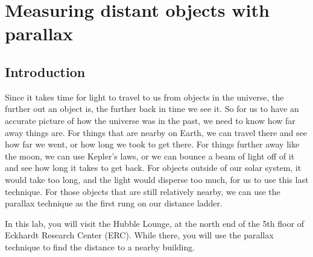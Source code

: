 \chapter{Measuring distant objects with parallax}






\section{Introduction}

Since it takes time for light to travel to us from objects in the universe, the further out an object is, the further back in time we see it. So for us to have an accurate picture of how the universe was in the past, we need to know how far away things are. For things that are nearby on Earth, we can travel there and see how far we went, or how long we took to get there. For things further away like the moon, we can use Kepler's laws, or we can bounce a beam of light off of it and see how long it takes to get back. For objects outside of our solar system, it would take too long, and the light would disperse too much, for us to use this last technique. For those objects that are still relatively nearby, we can use the parallax technique as the first rung on our distance ladder.

In this lab, you will visit the Hubble Lounge, at the north end of the 5th floor of Eckhardt Research Center (ERC). While there, you will use the parallax technique to find the distance to a nearby building.

